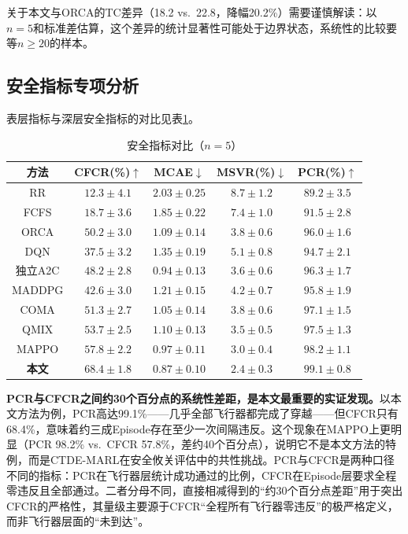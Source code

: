 \documentclass[12pt,a4paper,UTF8]{ctexart}
\begin{document}
关于本文与ORCA的TC差异（18.2 vs.\ 22.8，降幅20.2\%）需要谨慎解读：以$n=5$和标准差估算，这个差异的统计显著性可能处于边界状态，系统性的比较要等$n\geq20$的样本。

\subsection{安全指标专项分析}

表层指标与深层安全指标的对比见表\ref{tab:safety}。

\begin{table}[H]
    \centering
    \caption{安全指标对比（$n=5$）}
    \label{tab:safety}
    \begin{tabular}{|c|c|c|c|c|}
        \hline
        \textbf{方法} & \textbf{CFCR(\%)$\uparrow$} & \textbf{MCAE$\downarrow$} & \textbf{MSVR(\%)$\downarrow$} & \textbf{PCR(\%)$\uparrow$} \\
        \hline
        RR & $12.3\pm4.1$ & $2.03\pm0.25$ & $8.7\pm1.2$ & $89.2\pm3.5$ \\
        FCFS & $18.7\pm3.6$ & $1.85\pm0.22$ & $7.4\pm1.0$ & $91.5\pm2.8$ \\
        ORCA & $50.2\pm3.0$ & $1.09\pm0.14$ & $3.8\pm0.6$ & $96.0\pm1.6$ \\
        DQN & $37.5\pm3.2$ & $1.35\pm0.19$ & $5.1\pm0.8$ & $94.7\pm2.1$ \\
        独立A2C & $48.2\pm2.8$ & $0.94\pm0.13$ & $3.6\pm0.6$ & $96.3\pm1.7$ \\
        MADDPG & $42.6\pm3.0$ & $1.21\pm0.15$ & $4.2\pm0.7$ & $95.8\pm1.9$ \\
        COMA & $51.3\pm2.7$ & $1.05\pm0.14$ & $3.8\pm0.6$ & $97.1\pm1.5$ \\
        QMIX & $53.7\pm2.5$ & $1.10\pm0.13$ & $3.5\pm0.5$ & $97.5\pm1.3$ \\
        MAPPO & $57.8\pm2.2$ & $0.97\pm0.11$ & $3.0\pm0.4$ & $98.2\pm1.1$ \\
        \textbf{本文} & $\mathbf{68.4\pm1.8}$ & $\mathbf{0.87\pm0.10}$ & $\mathbf{2.4\pm0.3}$ & $\mathbf{99.1\pm0.8}$ \\
        \hline
    \end{tabular}
\end{table}

\textbf{PCR与CFCR之间约30个百分点的系统性差距，是本文最重要的实证发现。}以本文方法为例，PCR高达99.1\%——几乎全部飞行器都完成了穿越——但CFCR只有68.4\%，意味着约三成Episode存在至少一次间隔违反。这个现象在MAPPO上更明显（PCR 98.2\% vs.\ CFCR 57.8\%，差约40个百分点），说明它不是本文方法的特例，而是CTDE-MARL在安全攸关评估中的共性挑战。PCR与CFCR是两种口径不同的指标：PCR在飞行器层统计成功通过的比例，CFCR在Episode层要求全程零违反且全部通过。二者分母不同，直接相减得到的“约30个百分点差距”用于突出CFCR的严格性，其量级主要源于CFCR“全程所有飞行器零违反”的极严格定义，而非飞行器层面的“未到达”。
\end{document}
